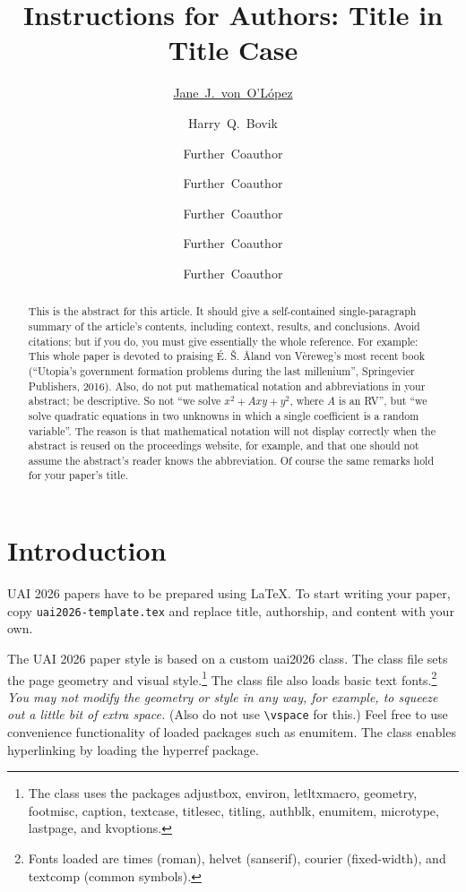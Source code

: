 \documentclass{uai2026} %
\title{Instructions for Authors: Title in Title Case}
\author[1]{\href{mailto:<jj@example.edu>?Subject=Your UAI 2026 paper}{Jane~J.~von~O'L\'opez}{}}
\author[1]{Harry~Q.~Bovik}
\author[1,2]{Further~Coauthor}
\author[3]{Further~Coauthor}
\author[1]{Further~Coauthor}
\author[3]{Further~Coauthor}
\author[3,1]{Further~Coauthor}
\affil[1]{%
  Computer Science Dept.\\
  Cranberry University\\
  Pittsburgh, Pennsylvania, USA
}
\affil[2]{%
  Second Affiliation\\
  Address\\
  …
}
\affil[3]{%
  Another Affiliation\\
  Address\\
  …
}
\begin{document}
\maketitle

\begin{abstract}
  This is the abstract for this article.
  It should give a self-contained single-paragraph summary of the article's contents, including context, results, and conclusions.
  Avoid citations; but if you do, you must give essentially the whole reference.
  For example: This whole paper is devoted to praising É. Š. Åland von Vèreweg's most recent book (“Utopia's government formation problems during the last millenium”, Springevier Publishers, 2016).
  Also, do not put mathematical notation and abbreviations in your abstract; be descriptive.
  So not “we solve \(x^2+A xy+y^2\), where \(A\) is an RV”, but “we solve quadratic equations in two unknowns in which a single coefficient is a random variable”.
  The reason is that mathematical notation will not display correctly when the abstract is reused on the proceedings website, for example, and that one should not assume the abstract's reader knows the abbreviation.
  Of course the same remarks hold for your paper's title.
\end{abstract}






\iffalse %
\section{Introduction}\label{sec:intro}
UAI 2026 papers have to be prepared using \LaTeX.
To start writing your paper, copy \texttt{uai2026-template.tex} and replace title, authorship, and content with your own.

The UAI 2026 paper style is based on a custom \textsf{uai2026} class.
The class file sets the page geometry and visual style.\footnote{%
  The class uses the packages \textsf{adjustbox}, \textsf{environ}, \textsf{letltxmacro}, \textsf{geometry}, \textsf{footmisc}, \textsf{caption}, \textsf{textcase}, \textsf{titlesec}, \textsf{titling}, \textsf{authblk}, \textsf{enumitem}, \textsf{microtype}, \textsf{lastpage}, and \textsf{kvoptions}.
}
The class file also loads basic text fonts.\footnote{%
  Fonts loaded are \textsf{times} (roman), \textsf{helvet} (sanserif), \textsf{courier} (fixed-width), and \textsf{textcomp} (common symbols).
}
\emph{You may not modify the geometry or style in any way, for example, to squeeze out a little bit of extra space.}
(Also do not use \verb|\vspace| for this.)
Feel free to use convenience functionality of loaded packages such as \textsf{enumitem}.
The class enables hyperlinking by loading the \textsf{hyperref} package.
\end{document}

